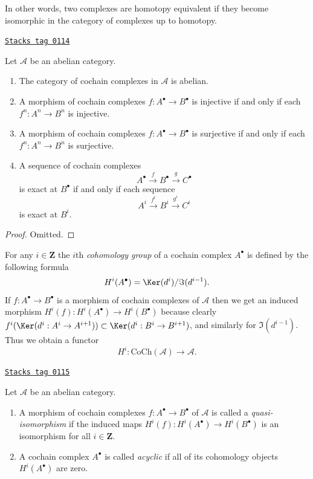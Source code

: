 In other words, two complexes are homotopy equivalent if they become
isomorphic in the category of complexes up to homotopy.

\begin{lemma}
\label{homology-lemma-cat-cochain-abelian}
\href{https://stacks.math.columbia.edu/tag/0114}{\texttt{Stacks tag 0114}}

Let $\mathcal{A}$ be an abelian category.
\begin{enumerate}
\item The category of cochain complexes in $\mathcal{A}$ is
abelian.
\item A morphism of cochain complexes
$f : A^\bullet \to B^\bullet$ is injective
if and only if each $f^n : A^n \to B^n$ is injective.
\item A morphism of cochain complexes
$f : A^\bullet \to B^\bullet$ is surjective
if and only if each $f^n : A^n \to B^n$ is surjective.
\item A sequence of cochain complexes
$$
A^\bullet \xrightarrow{f} B^\bullet \xrightarrow{g} C^\bullet
$$
is exact at $B^\bullet$ if and only if each sequence
$$
A^i \xrightarrow{f^i} B^i \xrightarrow{g^i} C^i
$$
is exact at $B^i$.
\end{enumerate}
\end{lemma}

\begin{proof}
Omitted.
\end{proof}

For any $i \in \mathbf{Z}$ the $i$th {\it cohomology group}
of a cochain complex $A^\bullet$ is defined by
the following formula
$$
H^i(A^\bullet) = \Ker(d^i)/\Im(d^{i - 1}).
$$
If $f : A^\bullet \to B^\bullet$ is a morphism of cochain
complexes of $\mathcal{A}$ then we get an induced
morphism $H^i(f) : H^i(A^\bullet) \to H^i(B^\bullet)$
because clearly
$f^i(\Ker(d^i : A^i \to A^{i + 1})) \subset
\Ker(d^i : B^i \to B^{i + 1})$, and similarly
for $\Im(d^{i - 1})$.
Thus we obtain a functor
$$
H^i : \text{CoCh}(\mathcal{A}) \longrightarrow \mathcal{A}.
$$

\begin{definition}
\label{homology-definition-quasi-isomorphism-cochain}
\href{https://stacks.math.columbia.edu/tag/0115}{\texttt{Stacks tag 0115}}

Let $\mathcal{A}$ be an abelian category.
\begin{enumerate}
\item A morphism of cochain complexes $f : A^\bullet \to B^\bullet$
of $\mathcal{A}$ is called a {\it quasi-isomorphism} if the induced
maps $H^i(f) : H^i(A^\bullet) \to H^i(B^\bullet)$
is an isomorphism for all $i \in \mathbf{Z}$.
\item A cochain complex $A^\bullet$ is called
{\it acyclic} if all of its cohomology objects
$H^i(A^\bullet)$ are zero.
\end{enumerate}
\end{definition}

